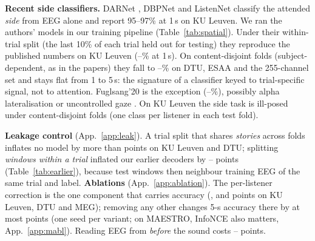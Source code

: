 \documentclass[twoside]{article}
\begin{document}
\begin{table}[!t]\centering\small
\caption{MAESTRO, 4-way matched, EEG only (chance 25\%). CoupleFlow: mean$\pm$s.d.\ over 3
seeds. \emph{Release timing}: audio anchored at the earliest playback timestamp, as in MERIT
and the benchmark, whose reported numbers are listed. \emph{Latency-corrected}: our causal
alignment. Contribution: per-trial accuracy minus the EEG-shuffle null.}\label{tab:maestro}
\resizebox{\columnwidth}{!}{}
\end{table}


\textbf{Recent side classifiers.} DARNet \citep{darnet2024}, DBPNet \citep{dbpnet2024}
and ListenNet \citep{listennet2025} classify the attended \emph{side} from EEG alone and report
95--97\% at 1\,s on KU Leuven. We ran the authors' models in our training pipeline
(Table~\ref{tab:spatial}). Under their within-trial split (the last 10\% of each trial held
out for testing) they reproduce the published numbers on KU Leuven (\spKULBmin--\spKULBmax\% at 1\,s). On content-disjoint
folds (subject-dependent, as in the papers) they fall to \spAmin--\spAmax\% on DTU, ESAA and
the 255-channel set and stays flat from 1 to 5\,s: the signature of a classifier keyed to
trial-specific signal, not to attention. Fuglsang'20 is the exception (\spFugMin--\spFugMax\%),
possibly alpha lateralisation or uncontrolled gaze \citep{rotaru2024what}. On KU Leuven the
side task is ill-posed under content-disjoint folds (one class per listener in each test
fold).

\begin{table}[!t]\centering\small
\caption{Recent side classifiers, accuracy (\%) under their within-trial split / our
content-disjoint folds (subject-dependent, as in the papers), next to CoupleFlow on the
content-disjoint folds (seed 0). $^\dagger$Ill-posed under content-disjoint folds (one class per
listener in each test fold).}\label{tab:spatial}
\resizebox{\columnwidth}{!}{}
\end{table}

\textbf{Leakage control} (App.~\ref{app:leak}). A trial split that shares \emph{stories}
across folds inflates no model by more than \leakMax{} points on KU Leuven and DTU;
splitting \emph{windows within a trial} inflated our earlier decoders by
\oldDropAllMin--\oldDropAllMax{} points (Table~\ref{tab:earlier}), because test windows then
neighbour training EEG of the same trial and label.
\textbf{Ablations} (App.~\ref{app:ablation}). The per-listener correction is the one
component that carries accuracy (\ablRankKUL, \ablRankDTU{} and \ablRankMEG{} points on KU
Leuven, DTU and MEG); removing any other changes 5-s accuracy there by at most \ablOtherMax{}
points (one seed per variant; on MAESTRO, InfoNCE also matters, App.~\ref{app:mabl}). Reading EEG from \emph{before} the sound costs \lagCtlDTU--\lagCtlKUL{} points.
\end{document}
